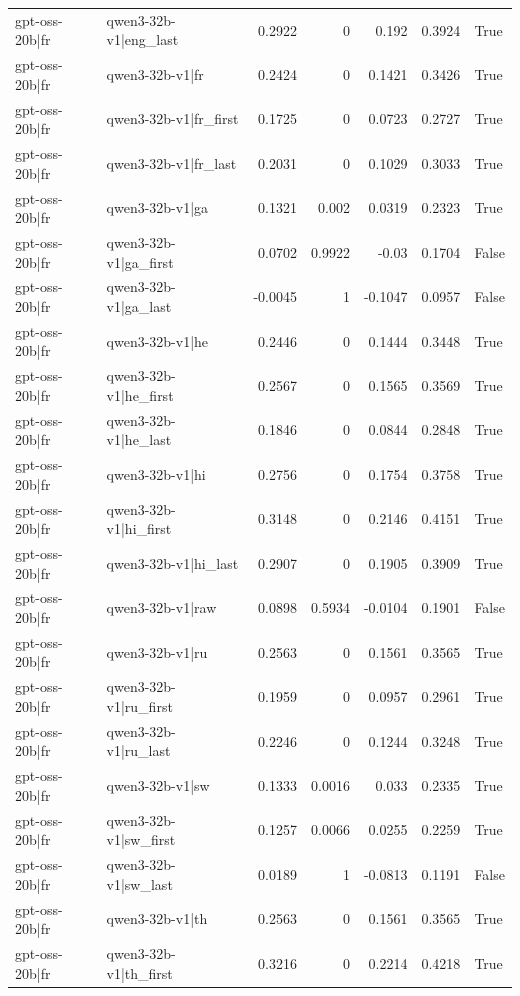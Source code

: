 \begin{table}
\begin{tabular}{l l r r r r l}
gpt-oss-20b|fr & qwen3-32b-v1|eng_last & 0.2922 & 0 & 0.192 & 0.3924 & True \\
gpt-oss-20b|fr & qwen3-32b-v1|fr & 0.2424 & 0 & 0.1421 & 0.3426 & True \\
gpt-oss-20b|fr & qwen3-32b-v1|fr_first & 0.1725 & 0 & 0.0723 & 0.2727 & True \\
gpt-oss-20b|fr & qwen3-32b-v1|fr_last & 0.2031 & 0 & 0.1029 & 0.3033 & True \\
gpt-oss-20b|fr & qwen3-32b-v1|ga & 0.1321 & 0.002 & 0.0319 & 0.2323 & True \\
gpt-oss-20b|fr & qwen3-32b-v1|ga_first & 0.0702 & 0.9922 & -0.03 & 0.1704 & False \\
gpt-oss-20b|fr & qwen3-32b-v1|ga_last & -0.0045 & 1 & -0.1047 & 0.0957 & False \\
gpt-oss-20b|fr & qwen3-32b-v1|he & 0.2446 & 0 & 0.1444 & 0.3448 & True \\
gpt-oss-20b|fr & qwen3-32b-v1|he_first & 0.2567 & 0 & 0.1565 & 0.3569 & True \\
gpt-oss-20b|fr & qwen3-32b-v1|he_last & 0.1846 & 0 & 0.0844 & 0.2848 & True \\
gpt-oss-20b|fr & qwen3-32b-v1|hi & 0.2756 & 0 & 0.1754 & 0.3758 & True \\
gpt-oss-20b|fr & qwen3-32b-v1|hi_first & 0.3148 & 0 & 0.2146 & 0.4151 & True \\
gpt-oss-20b|fr & qwen3-32b-v1|hi_last & 0.2907 & 0 & 0.1905 & 0.3909 & True \\
gpt-oss-20b|fr & qwen3-32b-v1|raw & 0.0898 & 0.5934 & -0.0104 & 0.1901 & False \\
gpt-oss-20b|fr & qwen3-32b-v1|ru & 0.2563 & 0 & 0.1561 & 0.3565 & True \\
gpt-oss-20b|fr & qwen3-32b-v1|ru_first & 0.1959 & 0 & 0.0957 & 0.2961 & True \\
gpt-oss-20b|fr & qwen3-32b-v1|ru_last & 0.2246 & 0 & 0.1244 & 0.3248 & True \\
gpt-oss-20b|fr & qwen3-32b-v1|sw & 0.1333 & 0.0016 & 0.033 & 0.2335 & True \\
gpt-oss-20b|fr & qwen3-32b-v1|sw_first & 0.1257 & 0.0066 & 0.0255 & 0.2259 & True \\
gpt-oss-20b|fr & qwen3-32b-v1|sw_last & 0.0189 & 1 & -0.0813 & 0.1191 & False \\
gpt-oss-20b|fr & qwen3-32b-v1|th & 0.2563 & 0 & 0.1561 & 0.3565 & True \\
gpt-oss-20b|fr & qwen3-32b-v1|th_first & 0.3216 & 0 & 0.2214 & 0.4218 & True \\

\end{tabular}
\end{table}
